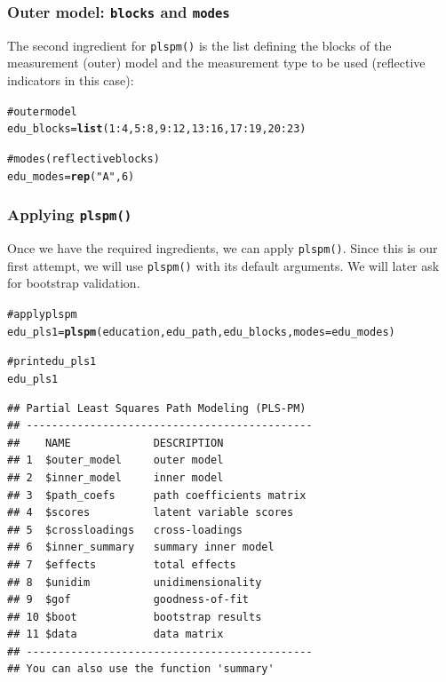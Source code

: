 \documentclass[12pt]{book}\usepackage{graphicx, color}
\makeatletter
\newcommand{\hlfunctioncall}[1]{\textcolor[rgb]{0.501960784313725,0,0.329411764705882}{\textbf{#1}}}%
\newcommand{\hlstring}[1]{\textcolor[rgb]{0.6,0.6,1}{#1}}%
\newcommand{\hlcomment}[1]{\textcolor[rgb]{0.180392156862745,0.6,0.341176470588235}{#1}}%
\newenvironment{kframe}{%
 \def\at@end@of@kframe{}%
 \ifinner\ifhmode%
  \def\at@end@of@kframe{\end{minipage}}%
  \begin{minipage}{\columnwidth}%
 \fi\fi%
 \def\FrameCommand##1{\hskip\@totalleftmargin \hskip-\fboxsep
 \colorbox{shadecolor}{##1}\hskip-\fboxsep
     \hskip-\linewidth \hskip-\@totalleftmargin \hskip\columnwidth}%
 \MakeFramed {\advance\hsize-\width
   \@totalleftmargin\z@ \linewidth\hsize
   \@setminipage}}%
 {\par\unskip\endMakeFramed%
 \at@end@of@kframe}
\newenvironment{knitrout}{}{} %
\newcommand{\fplspm}{\texttt{plspm()}}
\newcommand{\code}[1]{\texttt{#1}}
\makeatother
\begin{document}
\subsubsection*{Outer model: \code{blocks} and \code{modes}}
The second ingredient for \fplspm{} is the list defining the blocks of the measurement (outer) model and the measurement type to be used (reflective indicators in this case):
\begin{knitrout}
\color{fgcolor}\begin{kframe}
\begin{alltt}
\hlcomment{# outer model}
edu_blocks = \hlfunctioncall{list}(1:4, 5:8, 9:12, 13:16, 17:19, 20:23)

\hlcomment{# modes (reflective blocks)}
edu_modes = \hlfunctioncall{rep}(\hlstring{"A"}, 6)
\end{alltt}
\end{kframe}
\end{knitrout}


\subsubsection*{Applying \fplspm{}}
Once we have the required ingredients, we can apply \fplspm{}. Since this is our first attempt, we will use \fplspm{} with its default arguments. We will later ask for bootstrap validation.
\begin{knitrout}
\color{fgcolor}\begin{kframe}
\begin{alltt}
\hlcomment{# apply plspm}
edu_pls1 = \hlfunctioncall{plspm}(education, edu_path, edu_blocks, modes = edu_modes)

\hlcomment{# print edu_pls1}
edu_pls1
\end{alltt}
\begin{verbatim}
## Partial Least Squares Path Modeling (PLS-PM) 
## ---------------------------------------------
##    NAME             DESCRIPTION
## 1  $outer_model     outer model
## 2  $inner_model     inner model
## 3  $path_coefs      path coefficients matrix
## 4  $scores          latent variable scores
## 5  $crossloadings   cross-loadings
## 6  $inner_summary   summary inner model
## 7  $effects         total effects
## 8  $unidim          unidimensionality
## 9  $gof             goodness-of-fit
## 10 $boot            bootstrap results
## 11 $data            data matrix
## ---------------------------------------------
## You can also use the function 'summary'
\end{verbatim}
\end{kframe}
\end{knitrout}
\end{document}
